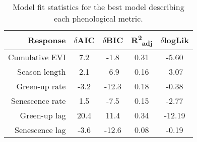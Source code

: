\begin{table}[H]
\centering
\begin{tabular}{rcccc}
  \hline
Response & $\delta$AIC & $\delta$BIC & R\textsuperscript{2}\textsubscript{adj} & $\delta$logLik \\ 
  \hline
Cumulative EVI & 7.2 & -1.8 & 0.31 & -5.60 \\ 
  Season length & 2.1 & -6.9 & 0.16 & -3.07 \\ 
  Green-up rate & -3.2 & -12.3 & 0.18 & -0.38 \\ 
  Senescence rate & 1.5 & -7.5 & 0.15 & -2.77 \\ 
  Green-up lag & 20.4 & 11.4 & 0.34 & -12.19 \\ 
  Senescence lag & -3.6 & -12.6 & 0.08 & -0.19 \\ 
   \hline
\end{tabular}
\caption{Model fit statistics for the best model describing each phenological metric.} 
\label{mod_stat}
\end{table}

